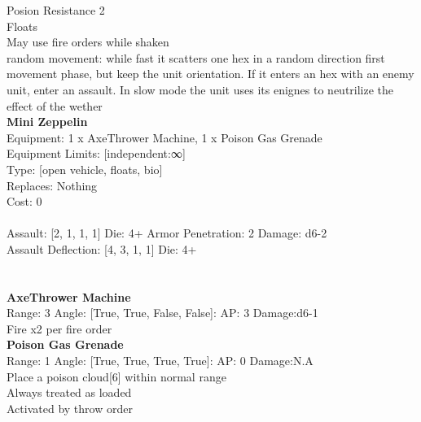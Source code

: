 \noindent Posion Resistance 2\\ 
Floats\\ 
May use fire orders while shaken\\ 
random movement: while fast it scatters one hex in a random direction first movement phase, but keep the unit orientation. If it enters an hex with an enemy unit, enter an assault. In slow mode the unit uses its enignes to neutrilize the effect of the wether\\ 


{\bf Mini Zeppelin } \\
Equipment: 1 x AxeThrower Machine, 1 x Poison Gas Grenade \\
Equipment Limits: [independent:∞] \\
Type: [open vehicle, floats, bio] \\
Replaces: Nothing \\
Cost: 0\\
\ \\
Assault: [2, 1, 1, 1] Die: 4+ Armor Penetration: 2 Damage: d6-2 \\
Assault Deflection: [4, 3, 1, 1] Die: 4+\\
\indent  
\ \\

\ \\
{\bf AxeThrower Machine } \\



Range: 3  Angle: [True, True, False, False]: AP: 3 Damage:d6-1 \\
Fire x2 per fire order\\ 




{\bf Poison Gas Grenade } \\



Range: 1  Angle: [True, True, True, True]: AP: 0 Damage:N.A \\
Place a poison cloud[6] within normal range\\ 
Always treated as loaded\\ 
Activated by throw order\\ 




 
\ \\



